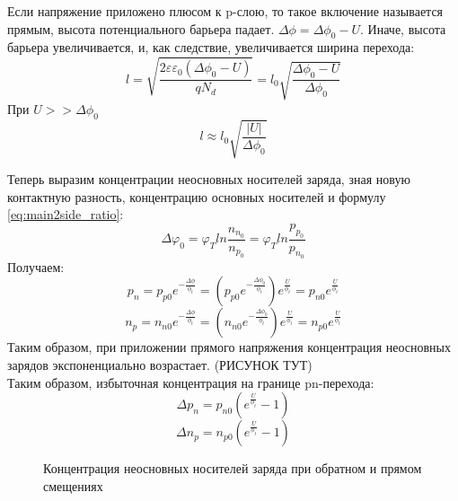 Если напряжение приложено плюсом к p-слою, то такое включение называется прямым, высота потенциального барьера падает. $\Delta \phi  = \Delta \phi_0 - U$.
Иначе, высота барьера увеличивается, и, как следствие, увеличивается ширина перехода:
\begin{equation}
l = \sqrt{\frac{2 \varepsilon \varepsilon_0 ( \Delta \phi_0 - U)}{q N_d} } = l_0 \sqrt{\frac{\Delta \phi_0 -U}{\Delta \phi_0}}
\end{equation} 
При $U >> \Delta \phi_0$ 
\begin{equation}
l \approx l_0 \sqrt{\frac{|U|}{\Delta \phi_0}}
\end{equation}

Теперь выразим концентрации неосновных носителей заряда, зная новую контактную разность, концентрацию основных носителей и формулу \ref{eq:main2side_ratio}:
\begin{equation}
\Delta\varphi_0 = \varphi_Tln\frac{n_{n_0}}{n_{p_0}} = \varphi_Tln\frac{p_{p_0}}{p_{n_0}}
\end{equation}
Получаем:
\begin{equation}
p_n = p_{p0} e^{- \frac{\Delta \phi }{\phi_t}} = (p_{p0} e^{- \frac{\Delta \phi_0 }{\phi_t}}) e^{\frac{U}{\phi_t}} = 
p_{n0} e^{\frac{U}{\phi_t}}
\end{equation}
\begin{equation}
n_p = n_{n0} e^{- \frac{\Delta \phi }{\phi_t}} = (n_{n0} e^{- \frac{\Delta \phi_0 }{\phi_t}}) e^{\frac{U}{\phi_t}} = 
n_{p0} e^{\frac{U}{\phi_t}}
\end{equation}
Таким образом, при приложении прямого напряжения концентрация неосновных зарядов экспоненциально возрастает. (РИСУНОК ТУТ)\\
Таким образом, избыточная концентрация на границе pn-перехода:
\begin{equation}
\Delta p_n = p_{n0} (e^{\frac{U}{\phi_t}}-1)
\end{equation}
\begin{equation}
\Delta n_p = n_{p0} (e^{\frac{U}{\phi_t}}-1)
\end{equation}

\begin{center}
	\begin{figure}[h!]
		\caption{Концентрация неосновных носителей заряда при обратном и прямом смещениях}	
		\label{pic:pn-conc_U}
	\end{figure}
\end{center}



